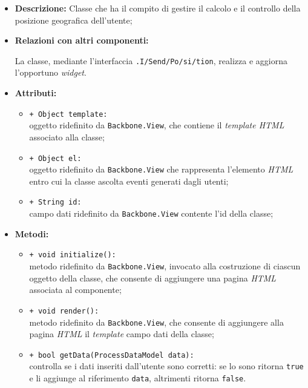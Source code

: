\begin{flushleft}
\begin{itemize}
\item \textbf{Descrizione:} Classe che ha il compito di gestire il calcolo e il controllo della posizione geografica dell'utente;
\item \textbf{Relazioni con altri componenti:}
\begin{sloppypar}
La classe, mediante l'interfaccia \texttt{\viewUser{}.I\fshyp{}Send\fshyp{}Po\fshyp{}si\fshyp{}tion}, realizza e aggiorna l'opportuno \textit{widget}.
\end{sloppypar}
\item \textbf{Attributi:}
\begin{sloppypar}
\begin{itemize}
\item \texttt{+ Object template:}\\ oggetto ridefinito da \texttt{Backbone.View}, che contiene il \textit{template HTML} associato alla classe;
\item \texttt{+ Object el:}\\ oggetto ridefinito da \texttt{Backbone.View} che rappresenta l'elemento \textit{HTML} entro cui la classe ascolta eventi generati dagli utenti;
\item \texttt{+ String id:}\\ campo dati ridefinito da \texttt{Backbone.View} contente l'id della classe;
\end{itemize}
\end{sloppypar}
\item \textbf{Metodi:}
\begin{sloppypar}
\begin{itemize}
\item \texttt{+ void initialize():}\\ metodo ridefinito da \texttt{Backbone.View}, invocato alla costruzione di ciascun oggetto della classe, che consente di aggiungere una pagina \textit{HTML} associata al componente;
\item \texttt{+ void render():}\\ metodo ridefinito da \texttt{Backbone.View}, che consente di aggiungere alla pagina \textit{HTML} il \textit{template} campo dati della classe;
\item \texttt{+ bool getData(ProcessDataModel data):}\\ controlla se i dati inseriti dall'utente sono corretti: se lo sono ritorna \texttt{true} e li aggiunge al riferimento \texttt{data}, altrimenti ritorna \texttt{false}.
\end{itemize}
\end{sloppypar}
\end{itemize}
\end{flushleft}

